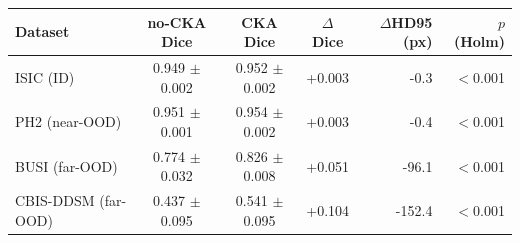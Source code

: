 \begin{tabular}{lcccrr}
\toprule
Dataset & no-CKA Dice & CKA Dice & $\Delta$Dice & $\Delta$HD95 (px) & $p$ (Holm) \\
\midrule
ISIC (ID) & 0.949 $\pm$ 0.002 & 0.952 $\pm$ 0.002 & +0.003 & -0.3 & $<$0.001 \\
PH2 (near-OOD) & 0.951 $\pm$ 0.001 & 0.954 $\pm$ 0.002 & +0.003 & -0.4 & $<$0.001 \\
BUSI (far-OOD) & 0.774 $\pm$ 0.032 & 0.826 $\pm$ 0.008 & +0.051 & -96.1 & $<$0.001 \\
CBIS-DDSM (far-OOD) & 0.437 $\pm$ 0.095 & 0.541 $\pm$ 0.095 & +0.104 & -152.4 & $<$0.001 \\
\bottomrule
\end{tabular}
